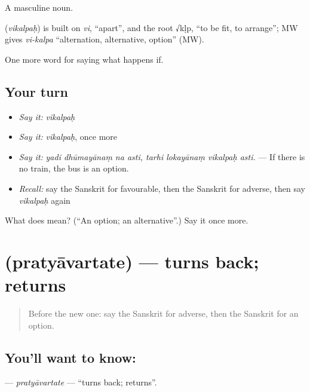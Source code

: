 A masculine noun.

\begin{cousinweb}
\textbf{} (\emph{vikalpaḥ}) is built on \emph{vi}, \textquotedblleft{}apart\textquotedblright{}, and the root √kḷp, \textquotedblleft{}to be fit, to arrange\textquotedblright{}; MW gives \emph{vi-kalpa} \textquotedblleft{}alternation, alternative, option\textquotedblright{} (MW).
\end{cousinweb}

\begin{grammarlens}[title={What you've built}]
One more word for saying what happens if.
\end{grammarlens}

\subsection*{Your turn}
\begin{itemize}
\raggedright
  \item \emph{Say it:} \emph{vikalpaḥ}
  \item \emph{Say it:} \emph{vikalpaḥ}, once more
  \item \emph{Say it:} \emph{yadi dhūmayānaṃ na asti, tarhi lokayānaṃ vikalpaḥ asti.} — If there is no train, the bus is an option.
  \item \emph{Recall:} say the Sanskrit for favourable, then the Sanskrit for adverse, then say \emph{vikalpaḥ} again
\end{itemize}

\begin{tcolorbox}[breakable,colback=teal!4,colframe=teal!35!black,title={Before you move on}]
What does  mean? (\textquotedblleft{}An option; an alternative\textquotedblright{}.) Say it once more.
\end{tcolorbox}
\section[\texorpdfstring{\sk{प्रत्यावर्तते} (pratyāvartate)}{प्रत्यावर्तते (pratyāvartate)}]{ (pratyāvartate) — turns back; returns}

\label{lesson:SA-C371-pratyavartate}



\begin{quote}
Before the new one: say the Sanskrit for adverse, then the Sanskrit for an option.
\end{quote}

\subsection*{You'll want to know: }
\textbf{} — \emph{pratyāvartate} — \textquotedblleft{}turns back; returns\textquotedblright{}.

